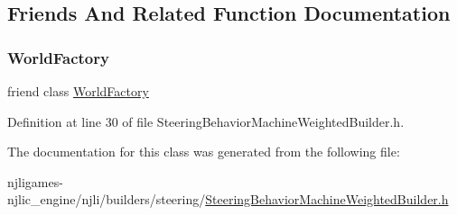 \subsection{Friends And Related Function Documentation}
\mbox{\label{classnjli_1_1_steering_behavior_machine_weighted_builder_acb96ebb09abe8f2a37a915a842babfac}} 
\subsubsection{\texorpdfstring{World\+Factory}{WorldFactory}}
{\footnotesize\ttfamily friend class \mbox{\hyperlink{classnjli_1_1_world_factory}{World\+Factory}}\hspace{0.3cm}{\ttfamily [friend]}}



Definition at line 30 of file Steering\+Behavior\+Machine\+Weighted\+Builder.\+h.



The documentation for this class was generated from the following file\+:\begin{DoxyCompactItemize}
\item 
njligames-\/njlic\+\_\+engine/njli/builders/steering/\mbox{\hyperlink{_steering_behavior_machine_weighted_builder_8h}{Steering\+Behavior\+Machine\+Weighted\+Builder.\+h}}\end{DoxyCompactItemize}
